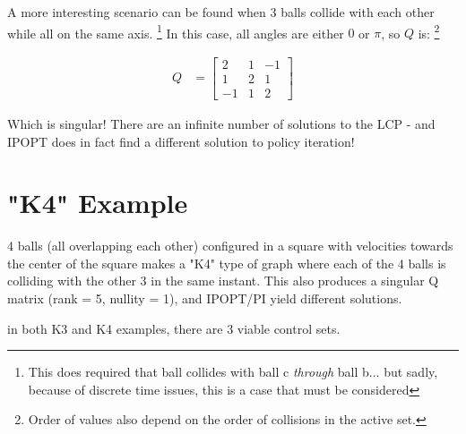 \documentclass[12pt]{article}
\begin{document}
A more interesting scenario can be found when 3 balls collide with each other while all on the same axis.
\footnote{
    This does required that ball collides with ball c \textit{through} ball b... but sadly, because of discrete
    time issues, this is a case that must be considered
}
In this case, all angles are either $0$ or $\pi$, so $Q$ is:
\footnote{Order of values also depend on the order of collisions in the active set.}

\begin{align*}
Q
    &= \begin{bmatrix}
        2 & 1 & -1\\
        1 & 2 & 1\\
        -1 & 1 & 2
    \end{bmatrix}
\end{align*}

Which is singular! There are an infinite number of solutions to the LCP
- and IPOPT does in fact find a different solution to policy iteration!

\section{"K4" Example}

4 balls (all overlapping each other) configured in a square with velocities
towards the center of the square makes a "K4" type of graph where each of the 4 balls
is colliding with the other 3 in the same instant.
This also produces a singular Q matrix (rank = 5, nullity = 1), and
IPOPT/PI yield different solutions.

in both K3 and K4 examples, there are 3 viable control sets.
\end{document}
